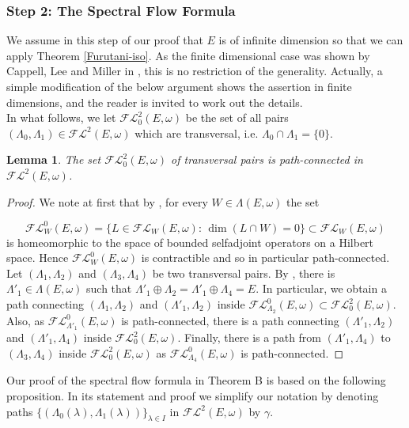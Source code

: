 \documentclass[a4paper,10pt]{article}
\newtheorem{lemma}[theorem]{Lemma}
\begin{document}

\subsubsection*{Step 2: The Spectral Flow Formula}
We assume in this step of our proof that $E$ is of infinite dimension so that we can apply Theorem \ref{Furutani-iso}. As the finite dimensional case was shown by Cappell, Lee and Miller in \cite{Cappell}, this is no restriction of the generality. Actually, a simple modification of the below argument shows the assertion in finite dimensions, and the reader is invited to work out the details.\\   
In what follows, we let $\mathcal{FL}^2_0(E,\omega)$ be the set of all pairs $(\Lambda_0,\Lambda_1)\in\mathcal{FL}^2(E,\omega)$ which are transversal, i.e. $\Lambda_0\cap\Lambda_1=\{0\}$. 

\begin{lemma}\label{lema-FL0pathconnected}
The set $\mathcal{FL}^2_0(E,\omega)$ of transversal pairs is path-connected in $\mathcal{FL}^2(E,\omega)$. 
\end{lemma}

\begin{proof}
We note at first that by \cite[Rem. 1.33]{Furutani}, for every $W\in\Lambda(E,\omega)$ the set 

\[\mathcal{FL}^0_W(E,\omega)=\{L\in\mathcal{FL}_W(E,\omega):\, \dim(L\cap W)=0\}\subset\mathcal{FL}_W(E,\omega)\]
is homeomorphic to the space of bounded selfadjoint operators on a Hilbert space. Hence $\mathcal{FL}^0_W(E,\omega)$ is contractible and so in particular path-connected.\\
Let $(\Lambda_1,\Lambda_2)$ and $(\Lambda_3,\Lambda_4)$ be two transversal pairs. By \cite{Piccione}, there is $\Lambda'_1\in\Lambda(E,\omega)$ such that $\Lambda'_1\oplus\Lambda_2=\Lambda'_1\oplus\Lambda_4=E$. In particular, we obtain a path connecting $(\Lambda_1,\Lambda_2)$ and $(\Lambda'_1,\Lambda_2)$ inside $\mathcal{FL}^0_{\Lambda_2}(E,\omega)\subset\mathcal{FL}^2_0(E,\omega)$. Also, as $\mathcal{FL}^0_{\Lambda'_1}(E,\omega)$ is path-connected, there is a path connecting $(\Lambda'_1,\Lambda_2)$ and $(\Lambda'_1,\Lambda_4)$ inside $\mathcal{FL}^2_0(E,\omega)$. Finally, there is a path from $(\Lambda'_1,\Lambda_4)$ to $(\Lambda_3,\Lambda_4)$ inside $\mathcal{FL}^2_0(E,\omega)$ as $\mathcal{FL}^0_{\Lambda_4}(E,\omega)$ is path-connected.   
\end{proof}
\noindent
Our proof of the spectral flow formula in Theorem B is based on the following proposition. In its statement and proof we simplify our notation by denoting paths $\{(\Lambda_0(\lambda),\Lambda_1(\lambda))\}_{\lambda\in I}$ in $\mathcal{FL}^2(E,\omega)$ by $\gamma$. 
\end{document}
